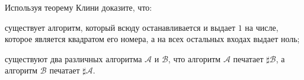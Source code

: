 Используя теорему Клини доказите, что:
\begin{enumcyr}
    \item существует алгоритм, который всюду останавливается и выдает $1$ на числе, которое является квадратом его номера, а
	    на всех остальных входах выдает ноль;
    \item существуют два различных алгоритма $\mathcal{A}$ и $\mathcal{B}$, что алгоритм $\mathcal{A}$ печатает $\sharp
	    \mathcal{B}$, а алгоритм $\mathcal{B}$ печатает $\sharp \mathcal{A}$.
\end{enumcyr}